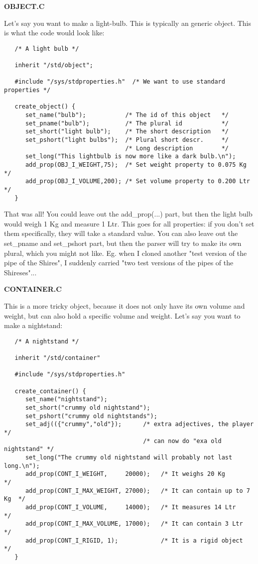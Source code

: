 {\bf OBJECT.C}

Let's say you want to make a light-bulb. This is typically an generic object.
This is what the code would look like:

\begin{verbatim}
   /* A light bulb */

   inherit "/std/object";

   #include "/sys/stdproperties.h"  /* We want to use standard properties */

   create_object() {
      set_name("bulb");           /* The id of this object   */
      set_pname("bulb");          /* The plural id           */
      set_short("light bulb");    /* The short description   */
      set_pshort("light bulbs");  /* Plural short descr.     */
                                  /* Long description        */
      set_long("This lightbulb is now more like a dark bulb.\n");
      add_prop(OBJ_I_WEIGHT,75);  /* Set weight property to 0.075 Kg  */
      add_prop(OBJ_I_VOLUME,200); /* Set volume property to 0.200 Ltr */
   }
\end{verbatim}

That was all! You could leave out the add\_prop(...) part, but then the
light bulb would weigh 1 Kg and measure 1 Ltr. This goes for all properties:
if you don't set them specifically, they will take a standard value. You
can also leave out the set\_pname and set\_pshort part, but then the parser
will try to make its own plural, which you might not like. Eg. when I
cloned another "test version of the pipe of the Shires", I suddenly
carried "two test versions of the pipes of the Shireses"...

{\bf CONTAINER.C}

This is a more tricky object, because it does not only have its own volume
and weight, but can also hold a specific volume and weight. Let's say you
want to make a nightstand:

\begin{verbatim}
   /* A nightstand */

   inherit "/std/container"

   #include "/sys/stdproperties.h"

   create_container() {
      set_name("nightstand");
      set_short("crummy old nightstand");
      set_pshort("crummy old nightstands");
      set_adj(({"crummy","old"});      /* extra adjectives, the player    */
                                       /* can now do "exa old nightstand" */
      set_long("The crummy old nightstand will probably not last long.\n");
      add_prop(CONT_I_WEIGHT,     20000);   /* It weighs 20 Kg            */
      add_prop(CONT_I_MAX_WEIGHT, 27000);   /* It can contain up to 7 Kg  */
      add_prop(CONT_I_VOLUME,     14000);   /* It measures 14 Ltr         */
      add_prop(CONT_I_MAX_VOLUME, 17000);   /* It can contain 3 Ltr       */
      add_prop(CONT_I_RIGID, 1);            /* It is a rigid object       */
   }
\end{verbatim}

